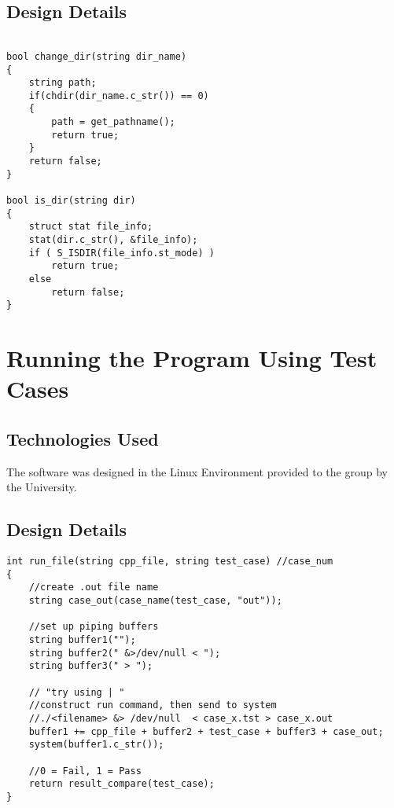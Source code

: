 \subsection{Design Details}

\begin{lstlisting}

bool change_dir(string dir_name)
{
    string path;
    if(chdir(dir_name.c_str()) == 0) 
    {
        path = get_pathname();
        return true;
    }
    return false;
}

bool is_dir(string dir)
{
    struct stat file_info;
    stat(dir.c_str(), &file_info);
    if ( S_ISDIR(file_info.st_mode) ) 
        return true;
    else 
        return false;
}
\end{lstlisting}

\section{Running the Program Using Test Cases }

\subsection{Technologies  Used}
The software was designed in the Linux Environment provided to the group by the University.



\subsection{Design Details}


\begin{lstlisting}
int run_file(string cpp_file, string test_case) //case_num
{
    //create .out file name
    string case_out(case_name(test_case, "out"));

    //set up piping buffers
    string buffer1("");
    string buffer2(" &>/dev/null < ");
    string buffer3(" > ");

    // "try using | "
    //construct run command, then send to system
    //./<filename> &> /dev/null  < case_x.tst > case_x.out
    buffer1 += cpp_file + buffer2 + test_case + buffer3 + case_out;
    system(buffer1.c_str());

    //0 = Fail, 1 = Pass
    return result_compare(test_case);
}
\end{lstlisting}


